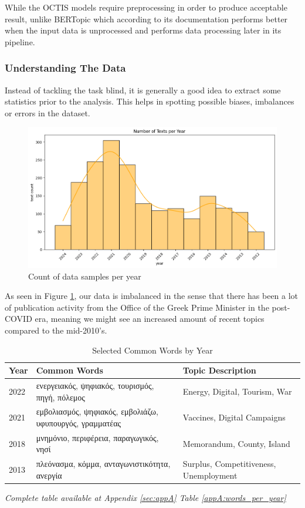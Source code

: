 While the OCTIS models require preprocessing in order to produce acceptable result, unlike BERTopic which according to its documentation performs better when the input data is unprocessed and performs data processing later in its pipeline.

\subsubsection{Understanding The Data}
Instead of tackling the task blind, it is generally a good idea to extract some statistics prior to the analysis. This helps in spotting possible biases, imbalances or errors in the dataset.

\begin{figure}[H]
\centering
\includegraphics[width=0.8\columnwidth]{figs/eda_texts.png}
\caption[]{Count of data samples per year}
\label{fig:EDA_texts}
\end{figure}

As seen in Figure \ref{fig:EDA_texts}, our data is imbalanced in the sense that there has been a lot of publication activity from the Office of the Greek Prime Minister in the post-COVID era, meaning we might see an increased amount of recent topics compared to the mid-2010's. 

\begin{table}[H]
\centering
\caption{Selected Common Words by Year}
\label{tab:commonwords}
\begin{tabular}{@{}p{1cm}p{5cm}p{4cm}@{}} %
\toprule
\textbf{Year} & \textbf{Common Words} & \textbf{Topic Description} \\
\midrule
2022 & \textgreek{ενεργειακός, ψηφιακός, τουρισμός, πηγή, πόλεμος} & Energy, Digital, Tourism, War \\
2021 & \textgreek{εμβολιασμός, ψηφιακός, εμβολιάζω, υφυπουργός, γραμματέας} & Vaccines, Digital Campaigns \\
2018 & \textgreek{μνημόνιο, περιφέρεια, παραγωγικός, νησί} & Memorandum, County, Island \\
2013 & \textgreek{πλεόνασμα, κόμμα, ανταγωνιστικότητα, ανεργία} & Surplus, Competitiveness, Unemployment \\
\bottomrule
\end{tabular}
\begin{tablenotes}
  \small
  \item \textit{Complete table available at Appendix \ref{sec:appA} Table \ref{appA:words_per_year}}
\end{tablenotes}
\end{table}




